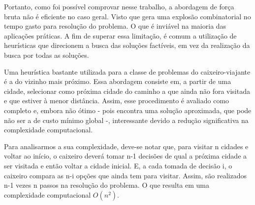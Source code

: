 \documentclass[a4paper, 12pt]{article} %
\begin{document}
	Portanto, como foi possível comprovar nesse trabalho, a abordagem de força bruta não é eficiente no caso geral. Visto que gera uma explosão combinatorial no tempo gasto para resolução do problema. O que é inviável na maioria das aplicações práticas. A fim de superar essa limitação, é comum a utilização de heurísticas que direcionem a busca das soluções factíveis, em vez da realização da busca por todas as soluções.
	
	Uma heurística bastante utilizada para a classe de problemas do caixeiro-viajante é a do vizinho mais próximo. Essa abordagem consiste em, a partir de uma cidade, selecionar como próxima cidade do caminho a que ainda não fora visitada e que estiver à menor distância. Assim, esse procedimento é avaliado como completo e, embora não ótimo - pois encontra uma solução aproximada, que pode não ser a de custo mínimo global -, interessante devido a redução significativa na complexidade computacional.
	
	Para analisarmos a sua complexidade, deve-se notar que, para visitar n cidades e voltar ao início, o caixeiro deverá tomar n-1 decisões de qual a próxima cidade a ser visitada e então voltar a cidade inicial. E, a cada tomada de decisão i, o caixeiro compara as n-i opções que ainda tem para visitar. Assim, são realizados n-1 vezes n passos na resolução do problema. O que resulta em uma complexidade computacional $O(n^2)$.
	
\end{document}
